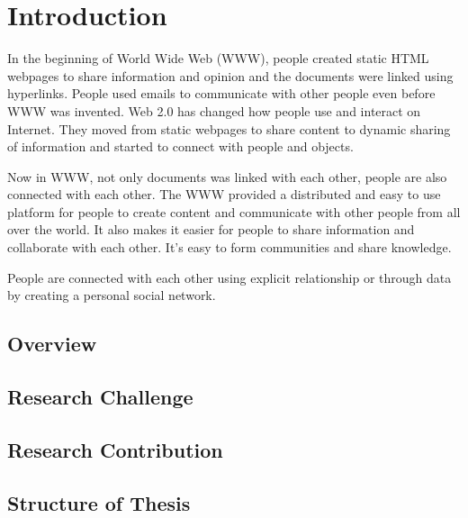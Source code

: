 

\chapter{Introduction} \label{Chapter:Introduction}

In the beginning of World Wide Web (WWW), people created static HTML webpages to share information and opinion and the documents were linked using hyperlinks. People used emails to communicate with other people even before WWW was invented. Web 2.0 has changed how people use and interact on Internet. They moved from static webpages to share content to dynamic sharing of information and started to connect with people and objects.

Now in WWW, not only documents was linked with each other, people are also connected with each other. The WWW provided a distributed and easy to use platform for people to create content and communicate with other people from all over the world. It also makes it easier for people to share information and collaborate with each other. It's easy to form communities and share knowledge.

People are connected with each other using explicit relationship or through data by creating a personal social network.




\section{Overview}
\section{Research Challenge}
\section{Research Contribution}
\section{Structure of Thesis}
 